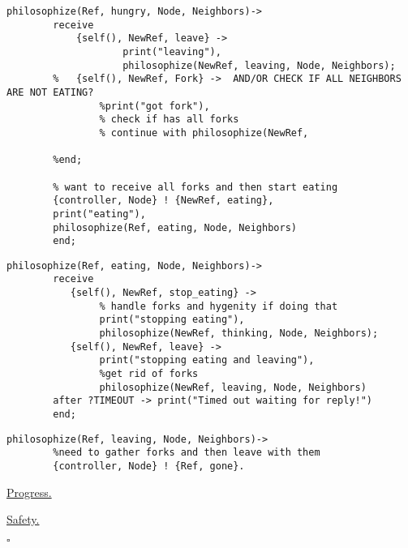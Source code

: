 \documentclass[11pt]{article}
\newenvironment{solution}{\noindent{\bf Solution.} }{

\hfill$\square$}
\begin{document}
\begin{solution}
\begin{lstlisting}
philosophize(Ref, hungry, Node, Neighbors)->
        receive
            {self(), NewRef, leave} ->
                    print("leaving"),
                    philosophize(NewRef, leaving, Node, Neighbors);
        %   {self(), NewRef, Fork} ->  AND/OR CHECK IF ALL NEIGHBORS ARE NOT EATING?
                %print("got fork"),
                % check if has all forks
                % continue with philosophize(NewRef, 

        %end;

        % want to receive all forks and then start eating
        {controller, Node} ! {NewRef, eating},
        print("eating"),
        philosophize(Ref, eating, Node, Neighbors)
        end;
\end{lstlisting}
\begin{lstlisting}
philosophize(Ref, eating, Node, Neighbors)->
        receive
           {self(), NewRef, stop_eating} ->
                % handle forks and hygenity if doing that
                print("stopping eating"),
                philosophize(NewRef, thinking, Node, Neighbors);
           {self(), NewRef, leave} ->
                print("stopping eating and leaving"),
                %get rid of forks
                philosophize(NewRef, leaving, Node, Neighbors)
        after ?TIMEOUT -> print("Timed out waiting for reply!")
        end;
\end{lstlisting}

\begin{lstlisting}
philosophize(Ref, leaving, Node, Neighbors)->
        %need to gather forks and then leave with them
        {controller, Node} ! {Ref, gone}.
\end{lstlisting}
\begin{enumerate}
\underline{\large{Progress.}}
\end{enumerate}

\begin{enumerate}
\underline{\large{Safety.}}
\end{enumerate}
\end{solution}
\end{document}
